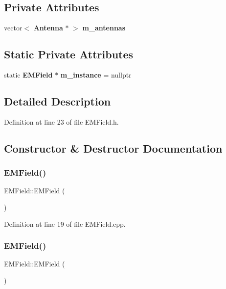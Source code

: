 \subsection*{Private Attributes}
\begin{DoxyCompactItemize}
\item 
vector$<$ \textbf{ Antenna} $\ast$ $>$ \textbf{ m\+\_\+antennas}
\end{DoxyCompactItemize}
\subsection*{Static Private Attributes}
\begin{DoxyCompactItemize}
\item 
static \textbf{ E\+M\+Field} $\ast$ \textbf{ m\+\_\+instance} = nullptr
\end{DoxyCompactItemize}


\subsection{Detailed Description}


Definition at line 23 of file E\+M\+Field.\+h.



\subsection{Constructor \& Destructor Documentation}
\mbox{\label{class_e_m_field_a054f389cfa853008f32c02d874aa4d58}} 
\subsubsection{EMField()\hspace{0.1cm}{\footnotesize\ttfamily [1/2]}}
{\footnotesize\ttfamily E\+M\+Field\+::\+E\+M\+Field (\begin{DoxyParamCaption}{ }\end{DoxyParamCaption})\hspace{0.3cm}{\ttfamily [private]}}



Definition at line 19 of file E\+M\+Field.\+cpp.

\mbox{\label{class_e_m_field_a7760631ded36ba2c5a918c97a1cc93e9}} 
\subsubsection{EMField()\hspace{0.1cm}{\footnotesize\ttfamily [2/2]}}
{\footnotesize\ttfamily E\+M\+Field\+::\+E\+M\+Field (\begin{DoxyParamCaption}\item[{const \textbf{ E\+M\+Field} \&}]{ }\end{DoxyParamCaption})\hspace{0.3cm}{\ttfamily [private]}}



